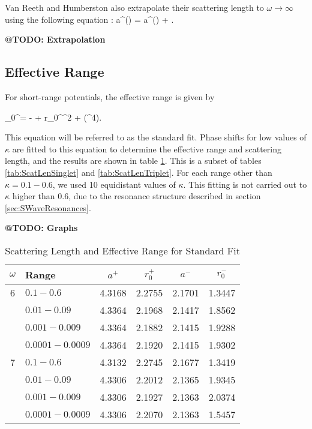 \documentclass[Dissertation.tex]{subfiles}
\begin{document}
\noindent Van Reeth and Humberston also extrapolate their scattering length to $\omega \rightarrow \infty$ using the following equation \cite{VanReeth2003}:
\beq
\label{eq:ScatLenExtrap}
a^\pm(\omega) = a^\pm(\omega \rightarrow \infty) + .
\eeq

\textbf{@TODO: Extrapolation}


\subsection{Effective Range}
For short-range potentials, the effective range is given by \cite{Bethe1949,Blatt1949,Drake2006}

\beq
\label{eq:EffectiveRangeShort}
\kappa \cot\eta_0^\pm = - +  r_0^\pm \kappa^2 + (\kappa^4).
\eeq

\noindent This equation will be referred to as the standard fit. Phase shifts for low values of $\kappa$ are fitted to this equation to determine the effective range and scattering length, and the results are shown in table \ref{tab:ScatLenStandard}. This is a subset of tables \ref{tab:ScatLenSinglet} and \ref{tab:ScatLenTriplet}. For each range other than $\kappa = 0.1 - 0.6$, we used 10 equidistant values of $\kappa$. This fitting is not carried out to $\kappa$ higher than 0.6, due to the resonance structure described in section \ref{sec:SWaveResonances}.

\textbf{@TODO: Graphs}

\begin{table}[H]
\centering
\begin{tabular}{c l c c c c}
\toprule
$\omega$ & Range & $a^+$ & $r_0^+$ & $a^-$ & $r_0^-$ \\
\midrule
6 & $0.1 - 0.6$ & 4.3168 & 2.2755 & 2.1701 & 1.3447 \\
  & $0.01 - 0.09$ & 4.3364 & 2.1968 & 2.1417 & 1.8562 \\
  & $0.001 - 0.009$ & 4.3364 & 2.1882 & 2.1415 & 1.9288 \\
  & $0.0001 - 0.0009$ & 4.3364 & 2.1920 & 2.1415 & 1.9302 \\
\midrule
7 & $0.1 - 0.6$ & 4.3132 & 2.2745 & 2.1677 & 1.3419 \\
  & $0.01 - 0.09$ & 4.3306 & 2.2012 & 2.1365 & 1.9345 \\
  & $0.001 - 0.009$ & 4.3306 & 2.1927 & 2.1363 & 2.0374 \\
  & $0.0001 - 0.0009$ & 4.3306 & 2.2070 & 2.1363 & 1.5457 \\
\bottomrule
\end{tabular}
\caption{Scattering Length and Effective Range for Standard Fit}
\label{tab:ScatLenStandard}
\end{table}
\end{document}
